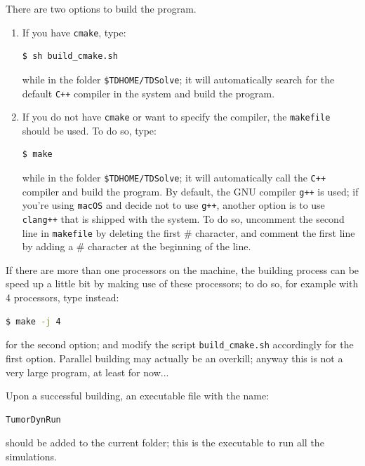 \documentclass{amsproc}
\theoremstyle{definition}
\theoremstyle{remark}
\numberwithin{equation}{section}
\numberwithin{figure}{section}
\begin{document}
There are two options to build the program.
\begin{enumerate}[Option 1]
  \item If you have \texttt{cmake}, type:
\begin{lstlisting}[backgroundcolor = \color{lightgray}, language = bash, xleftmargin = 0.1cm, framexleftmargin = 0.0cm]
$ sh build_cmake.sh
\end{lstlisting}
  while in the folder \texttt{\$TDHOME/TDSolve}; it will automatically search for the default \texttt{C++} compiler in the system and build the program.
  \item If you do not have \texttt{cmake} or want to specify the compiler, the \texttt{makefile} should be used.
  To do so, type:
  \begin{lstlisting}[backgroundcolor = \color{lightgray}, language = bash, xleftmargin = 0.1cm, framexleftmargin = 0.0cm]
  $ make 
  \end{lstlisting}
  while in the folder \texttt{\$TDHOME/TDSolve}; it will automatically call the \texttt{C++} compiler and build the program.
  By default, the GNU compiler \texttt{g++} is used; if you're using \texttt{macOS} and decide not to use \texttt{g++}, another option is to use \texttt{clang++} that is shipped with the system.
  To do so, uncomment the second line in \texttt{makefile} by deleting the first \# character, and comment the first line by adding a \# character at the beginning of the line.
\end{enumerate}

If there are more than one processors on the machine, the building process can be speed up a little bit by making use of these processors; to do so, for example with 4 processors, type instead:
\begin{lstlisting}[backgroundcolor = \color{lightgray}, language = bash, xleftmargin = 0.1cm, framexleftmargin = 0.0cm]
$ make -j 4
\end{lstlisting}
for the second option; and modify the script \texttt{build\_cmake.sh} accordingly for the first option.
Parallel building may actually be an overkill; anyway this is not a very large program, at least for now...

Upon a successful building, an executable file with the name:
\begin{lstlisting}[backgroundcolor = \color{lightgray}, language = bash, xleftmargin = 0.1cm, framexleftmargin = 0.1cm]
TumorDynRun
\end{lstlisting}
should be added to the current folder; this is the executable to run all the simulations.
\end{document}
